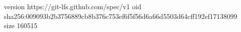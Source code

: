 version https://git-lfs.github.com/spec/v1
oid sha256:009093b2b3756889cb8b376c753ef6f5f56d6a66d5503d64cff192ef17138099
size 160515
